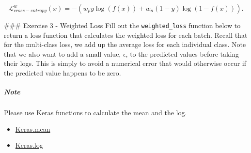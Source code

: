 \documentclass[11pt]{article}
\providecommand{\tightlist}{%
      \setlength{\itemsep}{0pt}\setlength{\parskip}{0pt}}
\begin{document}
\[\mathcal{L}_{cross-entropy}^{w}(x) = - (w_{p} y \log(f(x)) + w_{n}(1-y) \log( 1 - f(x) ) ).\]

     \#\#\# Exercise 3 - Weighted Loss Fill out the \texttt{weighted\_loss}
function below to return a loss function that calculates the weighted
loss for each batch. Recall that for the multi-class loss, we add up the
average loss for each individual class. Note that we also want to add a
small value, \(\epsilon\), to the predicted values before taking their
logs. This is simply to avoid a numerical error that would otherwise
occur if the predicted value happens to be zero.

\hypertarget{note}{%
\subparagraph{Note}\label{note}}

Please use Keras functions to calculate the mean and the log.

\begin{itemize}
\tightlist
\item
  \href{https://www.tensorflow.org/api_docs/python/tf/keras/backend/mean}{Keras.mean}
\item
  \href{https://www.tensorflow.org/api_docs/python/tf/keras/backend/log}{Keras.log}
\end{itemize}
\end{document}
